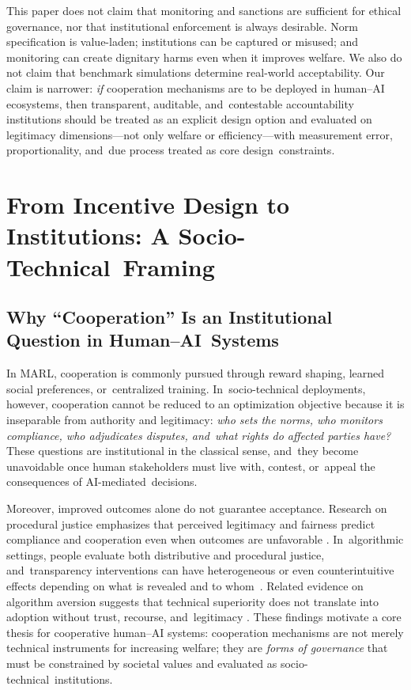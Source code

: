 \documentclass[mca,article,accept,pdftex,oneauthor]{Definitions/mdpi}
\begin{document}
This paper does not claim that monitoring and sanctions are sufficient for ethical governance, nor that institutional enforcement is always desirable. Norm specification is value-laden; institutions can be captured or misused; and monitoring can create dignitary harms even when it improves welfare. We also do not claim that benchmark simulations determine real-world acceptability. Our claim is narrower: \emph{if} cooperation mechanisms are to be deployed in human--AI ecosystems, then transparent, auditable, and~contestable accountability institutions should be treated as an explicit design option and evaluated on legitimacy dimensions---not only welfare or efficiency---with measurement error, proportionality, and~due process treated as core design~constraints.

\section{From Incentive Design to Institutions: A Socio-Technical~Framing}
\label{sec:framing}
\unskip

\subsection{Why ``Cooperation'' Is an Institutional Question in Human--AI~Systems}

In MARL, cooperation is commonly pursued through reward shaping, learned social preferences, or~centralized training. In~socio-technical deployments, however, cooperation cannot be reduced to an optimization objective because it is inseparable from authority and legitimacy: \emph{who sets the norms, who monitors compliance, who adjudicates disputes, and~what rights do affected parties have?} These questions are institutional in the classical sense, and~they become unavoidable once human stakeholders must live with, contest, or~appeal the consequences of AI-mediated~decisions.

Moreover, improved outcomes alone do not guarantee acceptance. Research on procedural justice emphasizes that perceived legitimacy and fairness predict compliance and cooperation even when outcomes are unfavorable \citep{Tyler1990}. In~algorithmic settings, people evaluate both distributive and procedural justice, and~transparency interventions can have heterogeneous or even counterintuitive effects depending on what is revealed and to \mbox{whom \citep{Binns2018CHI,Lee2019ProceduralJustice}.} Related evidence on algorithm aversion suggests that technical superiority does not translate into adoption without trust, recourse, and~legitimacy \citep{Dietvorst2015}. These findings motivate a core thesis for cooperative human--AI systems: cooperation mechanisms are not merely technical instruments for increasing welfare; they are \emph{forms of governance} that must be constrained by societal values and evaluated as socio-technical~institutions.
\end{document}
